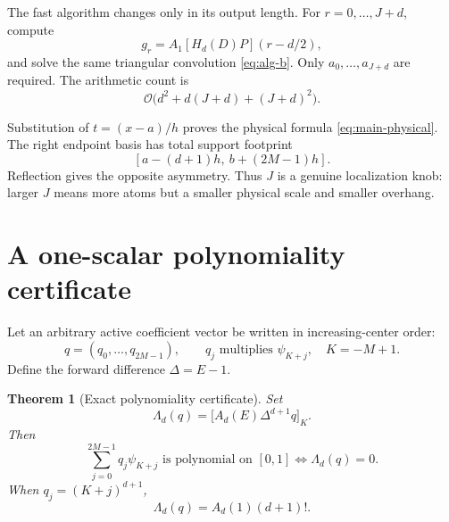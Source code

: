 \documentclass[11pt,oneside]{article}
\newtheorem{theorem}{Theorem}[section]
\theoremstyle{definition}
\theoremstyle{remark}
\newcommand{\bigO}{\mathcal O}
\begin{document}
The fast algorithm changes only in its output length.  For $r=0,\ldots,J+d$, compute
\begin{equation}
 g_r=A_1[H_d(D)P](r-d/2),                                 \label{eq:multi-g}
\end{equation}
and solve the same triangular convolution \eqref{eq:alg-b}.  Only $a_0,\ldots,a_{J+d}$ are required.  The arithmetic count is
\begin{equation}
 \bigO\bigl(d^2+d(J+d)+(J+d)^2\bigr).                    \label{eq:multi-complexity}
\end{equation}

Substitution of $t=(x-a)/h$ proves the physical formula \eqref{eq:main-physical}.  The right endpoint basis has total support footprint
\begin{equation}
 \left[a-(d+1)h,\ b+(2M-1)h\right].                       \label{eq:support-footprint}
\end{equation}
Reflection gives the opposite asymmetry.  Thus $J$ is a genuine localization knob: larger $J$ means more atoms but a smaller physical scale and smaller overhang.

\section{A one-scalar polynomiality certificate}
\label{sec:certificate}

Let an arbitrary active coefficient vector be written in increasing-center order:
\begin{equation}
 q=(q_0,\ldots,q_{2M-1}),
 \qquad q_j\text{ multiplies }\psi_{K+j},\quad K=-M+1.    \label{eq:q-order}
\end{equation}
Define the forward difference $\Delta=E-1$.

\begin{theorem}[Exact polynomiality certificate]
\label{thm:certificate}
Set
\begin{equation}
 \Lambda_d(q)=\bigl[A_d(E)\Delta^{d+1}q\bigr]_K.          \label{eq:Lambda-operator}
\end{equation}
Then
\begin{equation}
 \boxed{
 \sum_{j=0}^{2M-1}q_j\psi_{K+j}\text{ is polynomial on }[0,1]
 \iff \Lambda_d(q)=0.}                                    \label{eq:Lambda-iff}
\end{equation}
When $q_j=(K+j)^{d+1}$,
\begin{equation}
 \Lambda_d(q)=A_d(1)(d+1)!.                              \label{eq:Lambda-normalization}
\end{equation}
\end{theorem}
\end{document}
